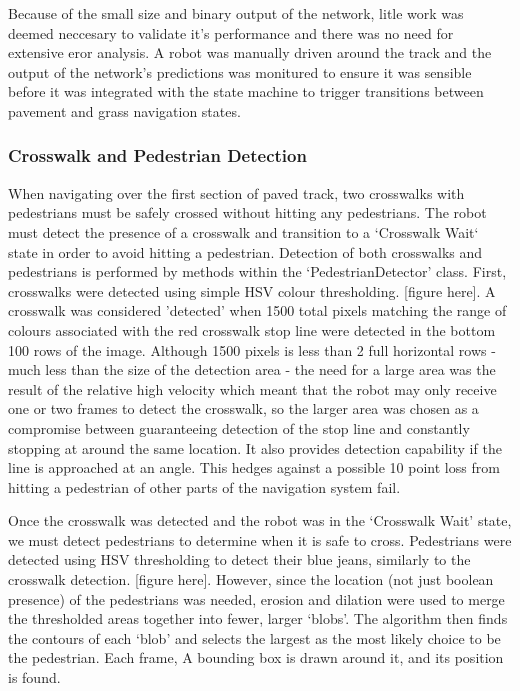 \documentclass[titlepage, twocolumn]{article}
\begin{document}
            Because of the small size and binary output of the network, litle work was deemed neccesary to validate it's performance and there was no need for extensive eror analysis. A robot was manually driven around the track and the output of the network's predictions was monitured to ensure it was sensible before it was integrated with the state machine to trigger transitions between pavement and grass navigation states.

        \subsubsection{Crosswalk and Pedestrian Detection}
            When navigating over the first section of paved track, two crosswalks with pedestrians must be safely crossed without hitting any pedestrians. The robot must detect the presence of a crosswalk and transition to a `Crosswalk Wait` state in order to avoid hitting a pedestrian. Detection of both crosswalks and pedestrians is performed by methods within the `PedestrianDetector' class. First, crosswalks were detected using simple HSV colour thresholding. [figure here]. A crosswalk was considered 'detected' when 1500 total pixels matching the range of colours associated with the red crosswalk stop line were detected in the bottom 100 rows of the image. Although 1500 pixels is less than 2 full horizontal rows - much less than the size of the detection area - the need for a large area was the result of the relative high velocity which meant that the robot may only receive one or two frames to detect the crosswalk, so the larger area was chosen as a compromise between guaranteeing detection of the stop line and constantly stopping at around the same location. It also provides detection capability if the line is approached at an angle. This hedges against a possible 10 point loss from hitting a pedestrian of other parts of the navigation system fail.

            Once the crosswalk was detected and the robot was in the `Crosswalk Wait' state, we must detect pedestrians to determine when it is safe to cross. Pedestrians were detected using HSV thresholding to detect their blue jeans, similarly to the crosswalk detection. [figure here]. However, since the location (not just boolean presence) of the pedestrians was needed, erosion and dilation were used to merge the thresholded areas together into fewer, larger `blobs'. The algorithm then finds the contours of each `blob' and selects the largest as the most likely choice to be the pedestrian. Each frame, A bounding box is drawn around it, and its position is found.
\end{document}
